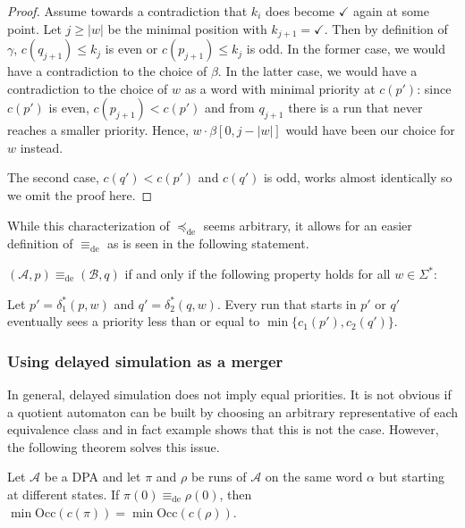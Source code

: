 \begin{proof}
	Assume towards a contradiction that $k_i$ does become $\checkmark$ again at some point. Let $j \geq |w|$ be the minimal position with $k_{j+1} = \checkmark$. Then by definition of $\gamma$, $c(q_{j+1}) \leq k_j$ is even or $c(p_{j+1}) \leq k_j$ is odd. In the former case, we would have a contradiction to the choice of $\beta$. In the latter case, we would have a contradiction to the choice of $w$ as a word with minimal priority at $c(p')$: since $c(p')$ is even, $c(p_{j+1}) < c(p')$ and from $q_{j+1}$ there is a run that never reaches a smaller priority. Hence, $w \cdot \beta[0, j-|w|]$ would have been our choice for $w$ instead.
	
	The second case, $c(q') < c(p')$ and $c(q')$ is odd, works almost identically so we omit the proof here.
\end{proof}

\vspace{5pt}

While this characterization of $\preceq_\text{de}$ seems arbitrary, it allows for an easier definition of $\equiv_\text{de}$ as is seen in the following statement.

\begin{cor}
\label{cor:fritzwilke:equivde_alternative}
	$(\mathcal{A}, p) \equiv_\text{de} (\mathcal{B}, q)$ if and only if the following property holds for all $w \in \Sigma^*$: 
	
	Let $p' = \delta_1^*(p, w)$ and $q' = \delta_2^*(q, w)$. Every run that starts in $p'$ or $q'$ eventually sees a priority less than or equal to $\min \{c_1(p'), c_2(q')\}$.
\end{cor}



\vspace{1cm}
\subsubsection*{Using delayed simulation as a merger}
In general, delayed simulation does not imply equal priorities. It is not obvious if a quotient automaton can be built by choosing an arbitrary representative of each equivalence class and in fact example %
shows that this is not the case. However, the following theorem solves this issue.

\begin{lem}
\label{lem:fritzwilke:equiv_states_same_minpri}
	Let $\mathcal{A}$ be a DPA and let $\pi$ and $\rho$ be runs of $\mathcal{A}$ on the same word $\alpha$ but starting at different states. If $\pi(0) \equiv_\text{de} \rho(0)$, then $\min \text{Occ}(c(\pi)) = \min \text{Occ}(c(\rho))$.
\end{lem}

